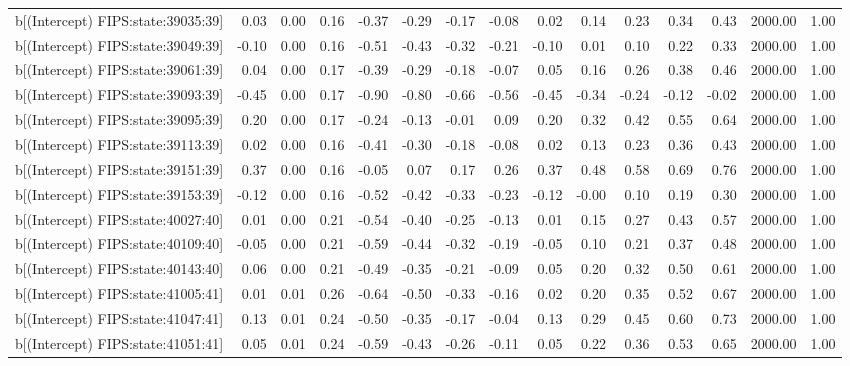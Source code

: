\begin{table}[ht]
\begin{tabular}{rrrrrrrrrrrrrrr}
  b[(Intercept) FIPS:state:39035:39] & 0.03 & 0.00 & 0.16 & -0.37 & -0.29 & -0.17 & -0.08 & 0.02 & 0.14 & 0.23 & 0.34 & 0.43 & 2000.00 & 1.00 \\ 
  b[(Intercept) FIPS:state:39049:39] & -0.10 & 0.00 & 0.16 & -0.51 & -0.43 & -0.32 & -0.21 & -0.10 & 0.01 & 0.10 & 0.22 & 0.33 & 2000.00 & 1.00 \\ 
  b[(Intercept) FIPS:state:39061:39] & 0.04 & 0.00 & 0.17 & -0.39 & -0.29 & -0.18 & -0.07 & 0.05 & 0.16 & 0.26 & 0.38 & 0.46 & 2000.00 & 1.00 \\ 
  b[(Intercept) FIPS:state:39093:39] & -0.45 & 0.00 & 0.17 & -0.90 & -0.80 & -0.66 & -0.56 & -0.45 & -0.34 & -0.24 & -0.12 & -0.02 & 2000.00 & 1.00 \\ 
  b[(Intercept) FIPS:state:39095:39] & 0.20 & 0.00 & 0.17 & -0.24 & -0.13 & -0.01 & 0.09 & 0.20 & 0.32 & 0.42 & 0.55 & 0.64 & 2000.00 & 1.00 \\ 
  b[(Intercept) FIPS:state:39113:39] & 0.02 & 0.00 & 0.16 & -0.41 & -0.30 & -0.18 & -0.08 & 0.02 & 0.13 & 0.23 & 0.36 & 0.43 & 2000.00 & 1.00 \\ 
  b[(Intercept) FIPS:state:39151:39] & 0.37 & 0.00 & 0.16 & -0.05 & 0.07 & 0.17 & 0.26 & 0.37 & 0.48 & 0.58 & 0.69 & 0.76 & 2000.00 & 1.00 \\ 
  b[(Intercept) FIPS:state:39153:39] & -0.12 & 0.00 & 0.16 & -0.52 & -0.42 & -0.33 & -0.23 & -0.12 & -0.00 & 0.10 & 0.19 & 0.30 & 2000.00 & 1.00 \\ 
  b[(Intercept) FIPS:state:40027:40] & 0.01 & 0.00 & 0.21 & -0.54 & -0.40 & -0.25 & -0.13 & 0.01 & 0.15 & 0.27 & 0.43 & 0.57 & 2000.00 & 1.00 \\ 
  b[(Intercept) FIPS:state:40109:40] & -0.05 & 0.00 & 0.21 & -0.59 & -0.44 & -0.32 & -0.19 & -0.05 & 0.10 & 0.21 & 0.37 & 0.48 & 2000.00 & 1.00 \\ 
  b[(Intercept) FIPS:state:40143:40] & 0.06 & 0.00 & 0.21 & -0.49 & -0.35 & -0.21 & -0.09 & 0.05 & 0.20 & 0.32 & 0.50 & 0.61 & 2000.00 & 1.00 \\ 
  b[(Intercept) FIPS:state:41005:41] & 0.01 & 0.01 & 0.26 & -0.64 & -0.50 & -0.33 & -0.16 & 0.02 & 0.20 & 0.35 & 0.52 & 0.67 & 2000.00 & 1.00 \\ 
  b[(Intercept) FIPS:state:41047:41] & 0.13 & 0.01 & 0.24 & -0.50 & -0.35 & -0.17 & -0.04 & 0.13 & 0.29 & 0.45 & 0.60 & 0.73 & 2000.00 & 1.00 \\ 
  b[(Intercept) FIPS:state:41051:41] & 0.05 & 0.01 & 0.24 & -0.59 & -0.43 & -0.26 & -0.11 & 0.05 & 0.22 & 0.36 & 0.53 & 0.65 & 2000.00 & 1.00 \\ 

\end{tabular}
\end{table}
